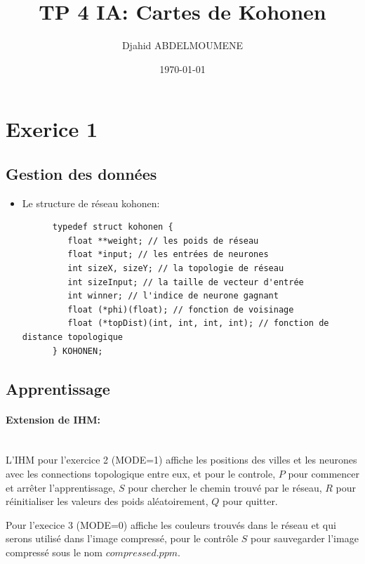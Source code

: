 \documentclass{article}
\title{TP 4 IA: Cartes de Kohonen}
\date{\today}
\author{Djahid ABDELMOUMENE}
\begin{document}
\maketitle

\section{Exerice 1}
\subsection{Gestion des données}
\begin{itemize}
   \item
      Le structure de réseau kohonen:
      \begin{lstlisting}
      typedef struct kohonen {
         float **weight; // les poids de réseau
         float *input; // les entrées de neurones
         int sizeX, sizeY; // la topologie de réseau
         int sizeInput; // la taille de vecteur d'entrée
         int winner; // l'indice de neurone gagnant
         float (*phi)(float); // fonction de voisinage
         float (*topDist)(int, int, int, int); // fonction de distance topologique
      } KOHONEN;
      \end{lstlisting}

\end{itemize}

\subsection{Apprentissage}
\paragraph{Extension de IHM:}\\
   L'IHM pour l'exercice 2 (MODE=1) affiche les positions des villes et
les neurones avec les connections topologique entre eux, et pour le
controle, $P$ pour commencer et arrêter l'apprentissage, $S$ pour
chercher le chemin trouvé par le réseau, $R$ pour réinitialiser les
valeurs des poids aléatoirement, $Q$ pour quitter.\\
\vspace{1mm}

Pour l'execice 3 (MODE=0) affiche les couleurs trouvés dans le réseau
et qui serons utilisé dans l'image compressé, pour le contrôle $S$ pour
sauvegarder l'image compressé sous le nom $compressed.ppm$.\\
\end{document}
